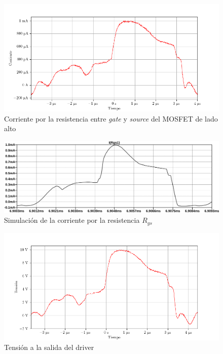 \begin{figure}[H]
    \centering
    \includegraphics[width=\textwidth]{images/capturas-osciloscopio/17-11-2022/13.png}
    \caption{Corriente por la resistencia entre \textit{gate} y \textit{source} del MOSFET de lado alto}
    \label{fig:osc:13}
\end{figure}

\begin{figure}[H]
    \centering
    \includegraphics[width=\textwidth]{images/sim/7.pdf}
    \caption{Simulación de la corriente por la resistencia $R_{gs}$}
    \label{fig:sim:7}
\end{figure}

\begin{figure}[H]
    \centering
    \includegraphics[width=\textwidth]{images/capturas-osciloscopio/17-11-2022/31.png} %
    \caption{Tensión a la salida del driver}
    \label{fig:driver_vout_connected}
\end{figure}


